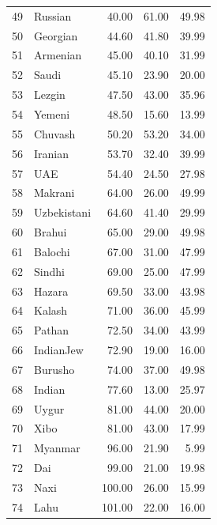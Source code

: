 \documentclass[10pt,letterpaper]{article}
\begin{document}
\begin{table}[ht]
\begin{tabular}{rlrrr}
  49 & \textcolor{Russian}{Russian} & 40.00 & 61.00 & 49.98 \\ 
  50 & \textcolor{Georgian}{Georgian} & 44.60 & 41.80 & 39.99 \\ 
  51 & \textcolor{Armenian}{Armenian} & 45.00 & 40.10 & 31.99 \\ 
  52 & \textcolor{Saudi}{Saudi} & 45.10 & 23.90 & 20.00 \\ 
  53 & \textcolor{Lezgin}{Lezgin} & 47.50 & 43.00 & 35.96 \\ 
  54 & \textcolor{Yemeni}{Yemeni} & 48.50 & 15.60 & 13.99 \\ 
  55 & \textcolor{Chuvash}{Chuvash} & 50.20 & 53.20 & 34.00 \\ 
  56 & \textcolor{Iranian}{Iranian} & 53.70 & 32.40 & 39.99 \\ 
  57 & \textcolor{UAE}{UAE} & 54.40 & 24.50 & 27.98 \\ 
  58 & \textcolor{Makrani}{Makrani} & 64.00 & 26.00 & 49.99 \\ 
  59 & \textcolor{Uzbekistani}{Uzbekistani} & 64.60 & 41.40 & 29.99 \\ 
  60 & \textcolor{Brahui}{Brahui} & 65.00 & 29.00 & 49.98 \\ 
  61 & \textcolor{Balochi}{Balochi} & 67.00 & 31.00 & 47.99 \\ 
  62 & \textcolor{Sindhi}{Sindhi} & 69.00 & 25.00 & 47.99 \\ 
  63 & \textcolor{Hazara}{Hazara} & 69.50 & 33.00 & 43.98 \\ 
  64 & \textcolor{Kalash}{Kalash} & 71.00 & 36.00 & 45.99 \\ 
  65 & \textcolor{Pathan}{Pathan} & 72.50 & 34.00 & 43.99 \\ 
  66 & \textcolor{IndianJew}{IndianJew} & 72.90 & 19.00 & 16.00 \\ 
  67 & \textcolor{Burusho}{Burusho} & 74.00 & 37.00 & 49.98 \\ 
  68 & \textcolor{Indian}{Indian} & 77.60 & 13.00 & 25.97 \\ 
  69 & \textcolor{Uygur}{Uygur} & 81.00 & 44.00 & 20.00 \\ 
  70 & \textcolor{Xibo}{Xibo} & 81.00 & 43.00 & 17.99 \\ 
  71 & \textcolor{Myanmar}{Myanmar} & 96.00 & 21.90 & 5.99 \\ 
  72 & \textcolor{Dai}{Dai} & 99.00 & 21.00 & 19.98 \\ 
  73 & \textcolor{Naxi}{Naxi} & 100.00 & 26.00 & 15.99 \\ 
  74 & \textcolor{Lahu}{Lahu} & 101.00 & 22.00 & 16.00 \\ 

\end{tabular}
\end{table}
\end{document}
